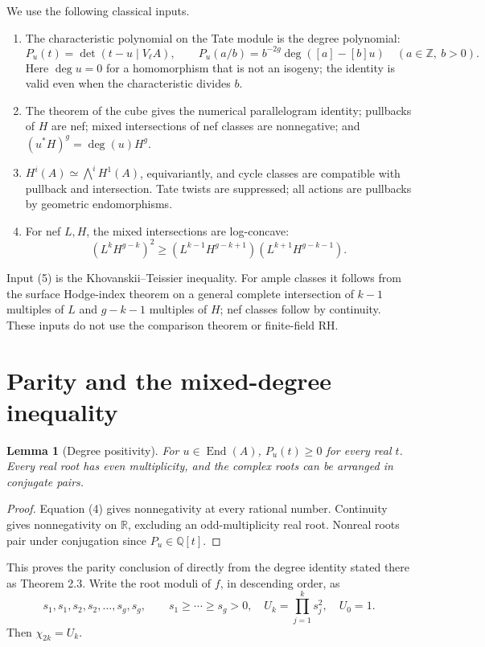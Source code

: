 \documentclass[11pt]{article}
\newtheorem{lemma}[theorem]{Lemma}
\newcommand{\End}{\operatorname{End}}
\newcommand{\Q}{\mathbb Q}
\newcommand{\R}{\mathbb R}
\begin{document}
We use the following classical inputs.
\begin{enumerate}
\item The characteristic polynomial on the Tate module is the degree
polynomial:
\[
 P_u(t)=\det(t-u\mid V_\ell A),\qquad
 P_u(a/b)=b^{-2g}\deg([a]-[b]u)\quad(a\in\mathbb Z,\ b>0).
 \tag{4}
\]
Here \(\deg u=0\) for a homomorphism that is not an isogeny;
the identity is valid even when the characteristic divides \(b\).
\item The theorem of the cube gives the numerical parallelogram identity;
pullbacks of \(H\) are nef; mixed intersections of nef classes are
nonnegative; and \((u^*H)^g=\deg(u)H^g\).
\item \(H^i(A)\simeq\bigwedge^i H^1(A)\), equivariantly, and cycle classes
are compatible with pullback and intersection. Tate twists are suppressed;
all actions are pullbacks by geometric endomorphisms.
\item For nef \(L,H\), the mixed intersections are log-concave:
\[
 (L^kH^{g-k})^2\ge
 (L^{k-1}H^{g-k+1})(L^{k+1}H^{g-k-1}).
 \tag{5}
\]
\end{enumerate}
Input (5) is the Khovanskii--Teissier inequality. For ample classes it
follows from the surface Hodge-index theorem on a general complete
intersection of \(k-1\) multiples of \(L\) and \(g-k-1\) multiples of \(H\);
nef classes follow by continuity. These inputs do not use the comparison
theorem or finite-field RH.

\section{Parity and the mixed-degree inequality}
\begin{lemma}[Degree positivity]\label{parity}
For \(u\in\End(A)\), \(P_u(t)\ge0\) for every real \(t\).
Every real root has even multiplicity, and the complex roots
can be arranged in conjugate pairs.
\end{lemma}
\begin{proof}
Equation (4) gives nonnegativity at every rational number. Continuity
gives nonnegativity on \(\R\), excluding an odd-multiplicity real
root. Nonreal roots pair under conjugation since \(P_u\in\Q[t]\).
\end{proof}
This proves the parity conclusion of \cite[Theorem 1.1]{Hu} directly
from the degree identity stated there as Theorem 2.3.
Write the root moduli of \(f\), in descending order, as
\[
 s_1,s_1,s_2,s_2,\ldots,s_g,s_g,\qquad s_1\ge\cdots\ge s_g>0,
 \quad U_k=\prod_{j=1}^k s_j^2,\quad U_0=1.
 \tag{6}
\]
Then \(\chi_{2k}=U_k\).
\end{document}
